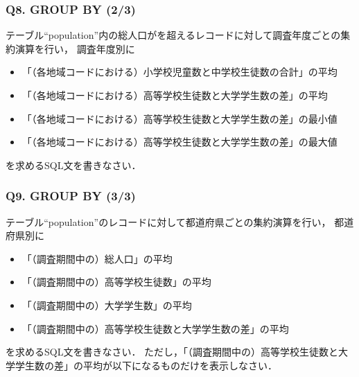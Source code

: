 \subsubsection{Q8. GROUP BY (2/3)}
テーブル``population''内の総人口がを超えるレコードに対して調査年度ごとの集約演算を行い，
調査年度別に
\begin{itemize}
\item 「（各地域コードにおける）小学校児童数と中学校生徒数の合計」の平均
\item 「（各地域コードにおける）高等学校生徒数と大学学生数の差」の平均
\item 「（各地域コードにおける）高等学校生徒数と大学学生数の差」の最小値
\item 「（各地域コードにおける）高等学校生徒数と大学学生数の差」の最大値
\end{itemize}
を求めるSQL文を書きなさい．

\subsubsection{Q9. GROUP BY (3/3)}
テーブル``population''のレコードに対して都道府県ごとの集約演算を行い，
都道府県別に
\begin{itemize}
\item 「（調査期間中の）総人口」の平均
\item 「（調査期間中の）高等学校生徒数」の平均
\item 「（調査期間中の）大学学生数」の平均
\item 「（調査期間中の）高等学校生徒数と大学学生数の差」の平均
\end{itemize}
を求めるSQL文を書きなさい．
ただし，「（調査期間中の）高等学校生徒数と大学学生数の差」の平均が以下になるものだけを表示しなさい．


